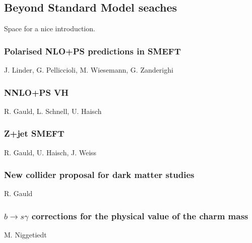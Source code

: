 \documentclass{FBR_Bericht_2025}
\begin{document}
\subsection{Beyond Standard Model seaches}
\begin{refsection}
Space for a nice introduction.
%
\subsubsection{Polarised NLO+PS predictions in SMEFT}
\begin{Namen}
J. Linder, G. Pelliccioli, M. Wiesemann, G. Zanderighi
\end{Namen}
%
\subsubsection{NNLO+PS VH}
\begin{Namen}
R. Gauld, L. Schnell, U. Haisch
\end{Namen}
%
\subsubsection{Z+jet SMEFT}
\begin{Namen}
R. Gauld, U. Haisch, J. Weiss
\end{Namen}
%
\subsubsection{New collider proposal for dark matter studies}
\begin{Namen}
R. Gauld
\end{Namen}
%
\subsubsection{$b\rightarrow s \gamma$ corrections for the physical value of the charm mass}
\begin{Namen}
M. Niggetiedt
\end{Namen}
%
\printbibliography[heading=subbibliography]
\end{refsection}


\clearpage
\onecolumn
\end{document}
